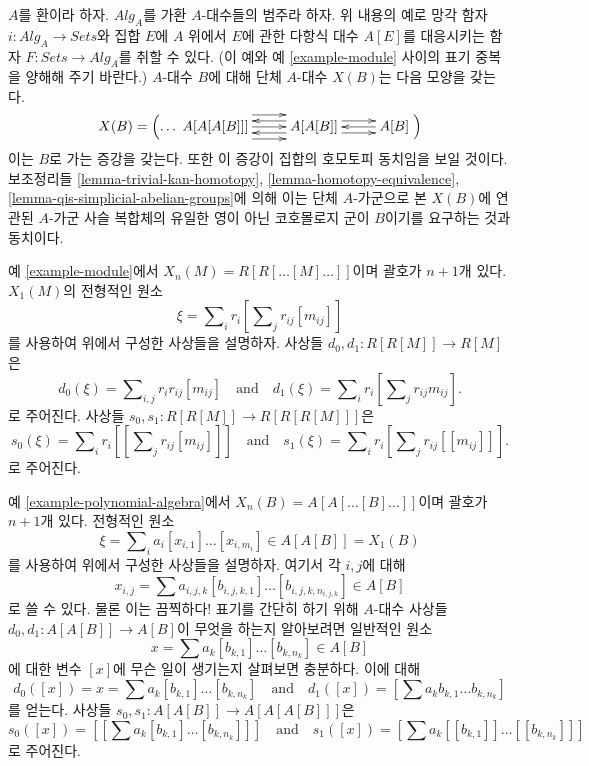 \begin{example}
\label{example-polynomial-algebra}
$A$를 환이라 하자. $\textit{Alg}_A$를 가환 $A$-대수들의 범주라 하자.
위 내용의 예로 망각 함자 $i : \textit{Alg}_A \to \textit{Sets}$와
집합 $E$에 $A$ 위에서 $E$에 관한 다항식 대수 $A[E]$를 대응시키는
함자 $F : \textit{Sets} \to \textit{Alg}_A$를 취할 수 있다.
(이 예와 예 \ref{example-module} 사이의 표기 중복을 양해해 주기 바란다.)
$A$-대수 $B$에 대해 단체 $A$-대수 $X(B)$는 다음 모양을 갖는다.
$$
X(B) = \left( \ldots
\xymatrix{
A[A[A[B]]]
\ar@<2ex>[r]
\ar@<0ex>[r]
\ar@<-2ex>[r]
&
A[A[B]]
\ar@<1ex>[r]
\ar@<-1ex>[r]
\ar@<1ex>[l]
\ar@<-1ex>[l]
&
A[B]
\ar@<0ex>[l]
}
\right)
$$
이는 $B$로 가는 증강을 갖는다. 또한 이 증강이 집합의 호모토피
동치임을 보일 것이다. 보조정리들
\ref{lemma-trivial-kan-homotopy}, \ref{lemma-homotopy-equivalence},
\ref{lemma-qis-simplicial-abelian-groups}에 의해 이는 단체 $A$-가군으로
본 $X(B)$에 연관된 $A$-가군 사슬 복합체의 유일한 영이 아닌
코호몰로지 군이 $B$이기를 요구하는 것과 동치이다.
\end{example}

\begin{example}
\label{example-module-maps}
예 \ref{example-module}에서 $X_n(M) = R[R[\ldots [M]\ldots]]$이며 괄호가
$n + 1$개 있다. $X_1(M)$의 전형적인 원소
$$
\xi = \sum\nolimits_i r_i\left[\sum\nolimits_j r_{ij}[m_{ij}]\right]
$$
를 사용하여 위에서 구성한 사상들을 설명하자. 사상들
$d_0, d_1 : R[R[M]] \to R[M]$은
$$
d_0(\xi) = \sum\nolimits_{i, j} r_ir_{ij}[m_{ij}]
\quad\text{and}\quad
d_1(\xi) = \sum\nolimits_i r_i\left[\sum\nolimits_j r_{ij}m_{ij}\right].
$$
로 주어진다. 사상들 $s_0, s_1 : R[R[M]] \to R[R[R[M]]]$은
$$
s_0(\xi) =
\sum\nolimits_i r_i\left[\left[\sum\nolimits_j r_{ij}[m_{ij}]\right]\right]
\quad\text{and}\quad
s_1(\xi) = \sum\nolimits_i r_i\left[\sum\nolimits_j r_{ij}[[m_{ij}]]\right].
$$
로 주어진다.
\end{example}

\begin{example}
\label{example-polynomial-algebra-maps}
예 \ref{example-polynomial-algebra}에서
$X_n(B) = A[A[\ldots [B]\ldots]]$이며 괄호가 $n + 1$개 있다.
전형적인 원소
$$
\xi = \sum\nolimits_i a_i [x_{i, 1}] \ldots [x_{i, m_i}] \in A[A[B]] = X_1(B)
$$
를 사용하여 위에서 구성한 사상들을 설명하자. 여기서 각 $i, j$에 대해
$$
x_{i, j} = \sum a_{i, j, k} [b_{i, j, k, 1}] \ldots [b_{i, j, k, n_{i, j, k}}]
\in A[B]
$$
로 쓸 수 있다. 물론 이는 끔찍하다! 표기를 간단히 하기 위해
$A$-대수 사상들 $d_0, d_1 : A[A[B]] \to A[B]$이 무엇을 하는지
알아보려면 일반적인 원소
$$
x = \sum a_k [b_{k, 1}] \ldots [b_{k, n_k}] \in A[B]
$$
에 대한 변수 $[x]$에 무슨 일이 생기는지 살펴보면 충분하다. 이에 대해
$$
d_0([x]) = x = \sum a_k [b_{k, 1}] \ldots [b_{k, n_k}]
\quad\text{and}\quad
d_1([x]) = \left[\sum a_k b_{k, 1} \ldots b_{k, n_k}\right]
$$
를 얻는다. 사상들 $s_0, s_1 : A[A[B]] \to A[A[A[B]]]$은
$$
s_0([x]) = \left[\left[\sum a_k [b_{k, 1}] \ldots [b_{k, n_k}]\right]\right]
\quad\text{and}\quad
s_1([x]) = \left[\sum a_k [[b_{k, 1}]] \ldots [[b_{k, n_k}]]\right]
$$
로 주어진다.
\end{example}

